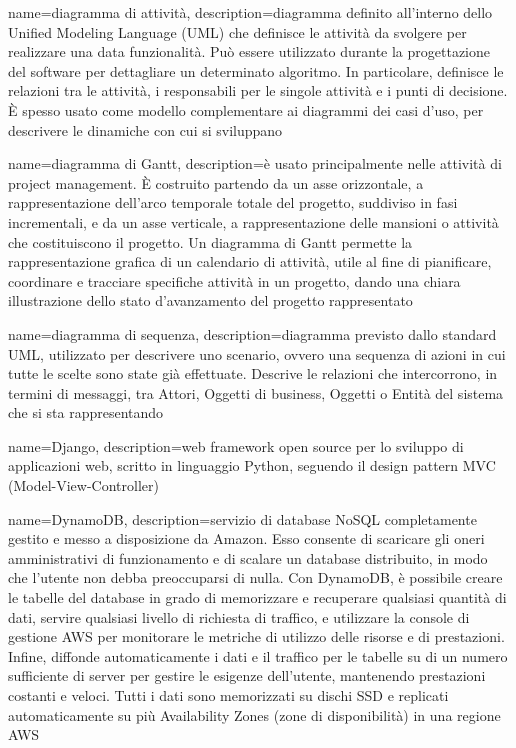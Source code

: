 {
	name=diagramma di attività,
	description={diagramma definito all'interno dello Unified Modeling Language (UML) che definisce le attività da svolgere per realizzare una data funzionalità. Può essere utilizzato durante la progettazione del software per dettagliare un determinato algoritmo. In particolare, definisce le relazioni tra le attività, i responsabili per le singole attività e i punti di decisione. \MakeUppercase{è} spesso usato come modello complementare ai diagrammi dei casi d'uso, per descrivere le dinamiche con cui si sviluppano}
}

{
	name=diagramma di Gantt,
	description={è usato principalmente nelle attivit\`{a} di project management. \MakeUppercase{\`{e}} costruito partendo da un asse orizzontale, a rappresentazione dell'arco temporale totale del progetto, suddiviso in fasi incrementali, e da un asse verticale, a rappresentazione delle mansioni o attivit\`{a} che costituiscono il progetto. Un diagramma di Gantt permette la rappresentazione grafica di un calendario di attivit\`{a}, utile al fine di pianificare, coordinare e tracciare specifiche attività in un progetto, dando una chiara illustrazione dello stato d'avanzamento del progetto rappresentato}
}

{
	name=diagramma di sequenza,
	description={diagramma previsto dallo standard UML, utilizzato per descrivere uno scenario, ovvero una sequenza di azioni in cui tutte le scelte sono state già effettuate. Descrive le relazioni che intercorrono, in termini di messaggi, tra Attori, Oggetti di business, Oggetti o Entità del sistema che si sta rappresentando
	}
}

{
	name=Django,
	description={web framework open source per lo sviluppo di applicazioni web, scritto in linguaggio Python, seguendo il design pattern MVC (Model-View-Controller)}
}

{
	name=DynamoDB,
	description={servizio di database NoSQL completamente gestito e messo a disposizione da Amazon. Esso consente di scaricare gli oneri amministrativi di funzionamento e di scalare un database distribuito, in modo che l'utente non debba preoccuparsi di nulla.
		Con DynamoDB, è possibile creare le tabelle del database in grado di memorizzare e recuperare qualsiasi quantità di dati, servire qualsiasi livello di richiesta di traffico, e utilizzare la console di gestione AWS per monitorare le metriche di utilizzo delle risorse e di prestazioni. Infine, diffonde automaticamente i dati e il traffico per le tabelle su di un numero sufficiente di server per gestire le esigenze dell'utente, mantenendo prestazioni costanti e veloci. Tutti i dati sono memorizzati su dischi SSD e replicati automaticamente su più Availability Zones (zone di disponibilità) in una regione AWS}
}
